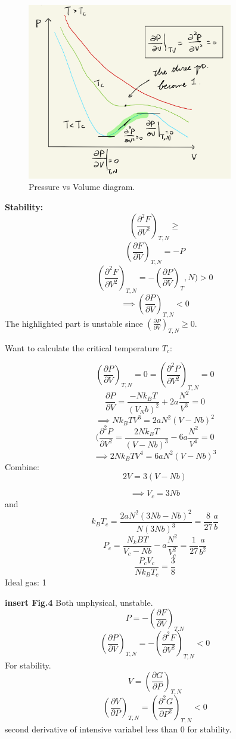 \documentclass[11pt]{book}
\theoremstyle{definition}
\begin{document}
\begin{figure}[ht]
	\centering
	\includegraphics[width=0.8\textwidth]{images/0702-03.png}
	\caption{Pressure vs Volume diagram.}
	\label{fig:PvsV}
\end{figure}
\textbf{Stability:} 
\[ \left (\frac{\partial ^2F}{\partial V^2} \right )_{T,N} \geq \] 
\[ \left (\frac{\partial F}{\partial V} \right )_{T,N} = -P \] 
\[ \left (\frac{\partial ^2F}{\partial V^2} \right )_{T,N} = - \left (\frac{\partial P}{\partial V} \right )_T,N) > 0 \] 
\[ \implies  \left (\frac{\partial P}{\partial V} \right )_{T,N} < 0\] 
The highlighted part is unstable since $ \left (\frac{\partial P}{\partial V} \right )_{T,N} \geq 0 $. 

Want to calculate the critical temperature $ T_c $:

\[ \left (\frac{\partial P}{\partial V} \right )_{T,N} = 0 = \left (\frac{\partial ^2P}{\partial V^2} \right )_{T,N} = 0 \] 
\[ \frac{\partial P}{\partial V} = \frac{-Nk_BT}{(V_Nb)^2} + 2a \frac{N^2}{V^3} = 0\] 
\[ \implies Nk_BTV^3 = 2aN^2 (V-Nb)^2 \] 
\[  (\frac{\partial ^2P}{\partial V^2}   = \frac{2Nk_BT}{(V-Nb)^3} - 6a \frac{N^2}{V^{4}} = 0\] 
\[ \implies 2Nk_BTV^4 = 6aN^2(V-Nb)^3 \] 
Combine:
\[ 2V = 3(V-Nb) \] 
\begin{shaded*}
	\[ \implies V_c = 3Nb \] 
and
\[ k_BT_c = \frac{2aN^2(3Nb-Nb)^2}{N(3Nb)^3} =  \frac{8}{27}\frac{a}{b}\] 
\[ P_c = \frac{N_kBT}{V_c-Nb} - a \frac{N^2}{V_c^2} = \frac{1}{27}\frac{a}{b^2} \] 
\[ \frac{P_cV_c}{Nk_BT_c} = \frac{3}{8} \] Ideal gas: 1
\end{shaded*}

\textbf{insert Fig.4} 
Both unphysical, unstable.
\[ P = -\left (\frac{\partial F}{\partial V} \right )_{T.N} \] 
\[ \left (\frac{\partial P}{\partial V} \right )_{T,N} = - \left (\frac{\partial ^2F}{\partial V^2} \right )_{T,N} < 0 \] 
For stability.
\[ V = \left (\frac{\partial G}{\partial P} \right )_{T,N}\] 
\[ \left (\frac{\partial V}{\partial P} \right )_{T,N} = \left (\frac{\partial ^2G}{\partial P^2} \right )_{T,N} < 0 \] second derivative of intensive variabel less than $ 0 $ for stability. 
\end{document}
